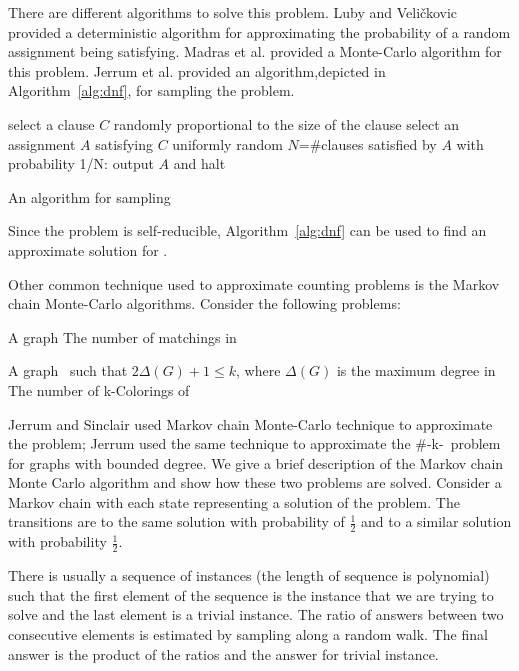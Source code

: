 There are different algorithms to solve this problem.
Luby and Veli\v{c}kovic \cite{Luby} provided a deterministic algorithm for
approximating the probability of a random assignment being satisfying. 
Madras et al. \cite{Madras} provided a Monte-Carlo algorithm
for this problem. Jerrum et al. \cite{JVV} provided an algorithm,depicted in Algorithm~\ref{alg:dnf},
for sampling the  problem. 
\begin{algorithm}[h]
\begin{algorithmic}
	\STATE  select a clause \(C\) randomly proportional to the size of the clause
	\STATE  select an assignment \(A\) satisfying \(C\) uniformly random
	\STATE  \(N\)=\#clauses satisfied by \(A\)
	\STATE with probability 1/N: output \(A\) and halt
\ENDWHILE
\end{algorithmic}
\caption{An algorithm for sampling }\label{alg:dnf}
\end{algorithm}

Since the  problem is self-reducible, Algorithm~\ref{alg:dnf} can
be used to find an approximate solution for \@.

Other common technique used to approximate counting problems is the Markov chain
Monte-Carlo algorithms. Consider the following problems:

{A graph \mG}
{The number of matchings in \mG}

\newcommand{\ldkcol}{\#\pname{LowDegree}-k-\pname{Coloring}}
\pdef{\ldkcol}
{A graph \mG\ such that \(2\Delta(G)+1\le k\), where \(\Delta(G)\)
is the maximum degree in \mG}
{The number of k-Colorings of \mG}

Jerrum and Sinclair \cite{Jerrum96} used Markov chain Monte-Carlo technique 
to approximate the  problem; Jerrum \cite{Jerrum} used the same technique 
to approximate the \ldkcol\ problem for graphs 
with bounded degree. We give a brief description of the Markov chain Monte Carlo algorithm
and show how these two problems are solved.
Consider a Markov chain with each state representing a solution of the problem.
The transitions are to the same solution with probability of \(\frac{1}{2}\) 
and to a similar solution with probability \(\frac{1}{2}\).

There is usually a sequence of instances (the length of sequence is polynomial) such that
the first element of the sequence is the instance  that we are trying to solve
and the last element is a trivial instance.
The ratio of answers between two consecutive elements 
is estimated by sampling along a random walk.
The final answer is the product of the ratios and the answer for trivial instance. 

